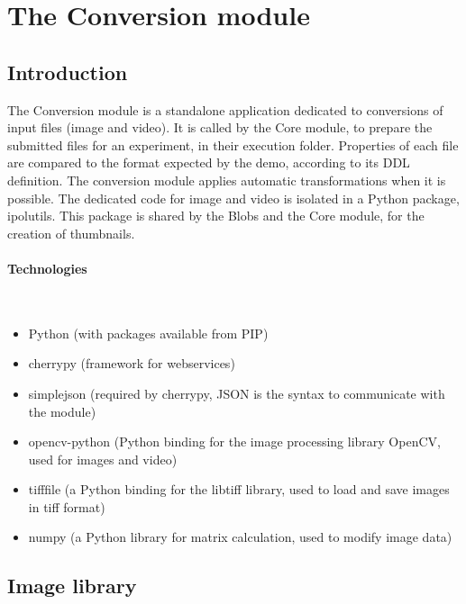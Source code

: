 \section{The Conversion module}
\label{sec:conversion}


\subsection{Introduction}
\label{sec:archive_introduction}

The Conversion module is a standalone application dedicated to conversions of input files (image and video). It is called by the Core module, to prepare the submitted files for an experiment, in their execution folder. Properties of each file are compared to the format expected by the demo, according to its DDL definition. The conversion module applies automatic transformations when it is possible. The dedicated code for image and video is isolated in a Python package, ipolutils. This package is shared by the Blobs and the Core module, for the creation of thumbnails.

\paragraph{Technologies} \hspace{0pt} \\
\begin{itemize}
\item Python (with packages available from PIP)
\item cherrypy (framework for webservices)
\item simplejson (required by cherrypy, JSON is the syntax to communicate with the module)
\item opencv-python (Python binding for the image processing library OpenCV, used for images and video)
\item tifffile (a Python binding for the libtiff library, used to load and save images in tiff format)
\item numpy (a Python library for matrix calculation, used to modify image data)
\end{itemize}


\subsection{Image library}

